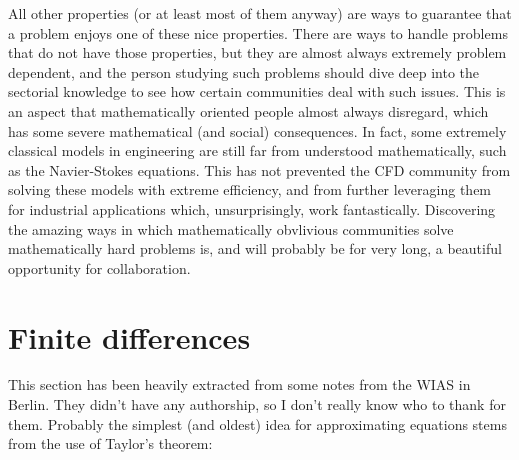 \documentclass{article}
\begin{document}
All other properties (or at least most of them anyway) are ways to guarantee that a problem enjoys one of these nice properties. There are ways to handle problems that do not have those properties, but they are almost always extremely problem dependent, and the person studying such problems should dive deep into the sectorial knowledge to see how certain communities deal with such issues. This is an aspect that mathematically oriented people almost always disregard, which has some severe mathematical (and social) consequences. In fact, some extremely classical models in engineering are still far from understood mathematically, such as the Navier-Stokes equations. This has not prevented the CFD community from solving these models with extreme efficiency, and from further leveraging them for industrial applications which, unsurprisingly, work fantastically. Discovering the amazing ways in which mathematically obvlivious communities solve mathematically hard problems is, and will probably be for very long, a beautiful opportunity for collaboration.

\section{Finite differences}
This section has been heavily extracted from some notes from the WIAS in Berlin. They didn't have any authorship, so I don't really know who to thank for them.  Probably the simplest (and oldest) idea for approximating equations stems from the use of Taylor's theorem:
\end{document}
